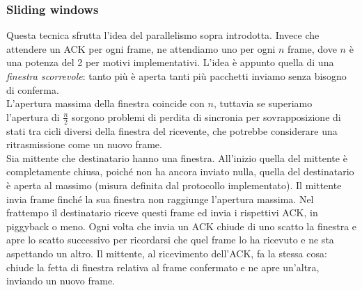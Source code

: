 \documentclass[10pt,a4paper,twoside]{article}
\begin{document}
\subsubsection{Sliding windows}
Questa tecnica sfrutta l'idea del parallelismo sopra introdotta. Invece che attendere un ACK per ogni frame, ne attendiamo uno per ogni $n$ frame, dove $n$ è una potenza del 2 per motivi implementativi. L'idea è appunto quella di una \textit{finestra scorrevole}: tanto più è aperta tanti più pacchetti inviamo senza bisogno di conferma.\\
L'apertura massima della finestra coincide con $n$, tuttavia se superiamo l'apertura di $\frac{n}{2}$ sorgono problemi di perdita di sincronia per sovrapposizione di stati tra cicli diversi della finestra del ricevente, che potrebbe considerare una ritrasmissione come un nuovo frame.\\
Sia mittente che destinatario hanno una finestra. All'inizio quella del mittente è completamente chiusa, poiché non ha ancora inviato nulla, quella del destinatario è aperta al massimo (misura definita dal protocollo implementato). Il mittente invia frame finché la sua finestra non raggiunge l'apertura massima. Nel frattempo il destinatario riceve questi frame ed invia i rispettivi ACK, in piggyback o meno. Ogni volta che invia un ACK chiude di uno scatto la finestra e apre lo scatto successivo per ricordarsi che quel frame lo ha ricevuto e ne sta aspettando un altro. Il mittente, al ricevimento dell'ACK, fa la stessa cosa: chiude la fetta di finestra relativa al frame confermato e ne apre un'altra, inviando un nuovo frame.
\end{document}
